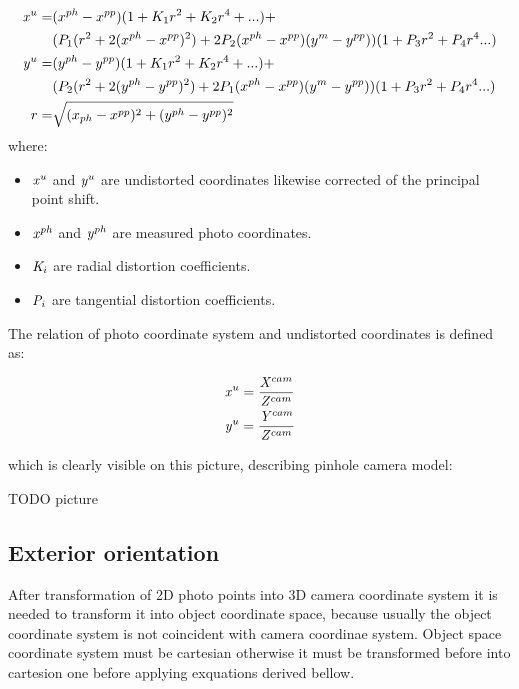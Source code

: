 \documentclass[a4paper,12pt]{report}
\newcommand{\escal}[1]{
{\it #1}
}
\begin{document}
\begin{equation}
\label{eq:undistort}
\begin{split}
\escal{x}^{u} =& (x^{ph} - x^{pp})(1 + K_{1}r^2 + K_2r^4 + ...) + \\
&(P_1(r^2 + 2(x^{ph} - x^{pp})^2) + 2P_2(x^{ph} - x^{pp})(y^{m} - y^{pp}))(1 + P_3r^2 + P_4r^4 ...) \\
\escal{y}^{u} =& (y^{ph} - y^{pp})(1 + K_1r^2 + K_2r^4 + ...) + \\
&(P_2(r^2 + 2(y^{ph} - y^{pp})^2) + 2P_1(x^{ph} - x^{pp})(y^{m} - y^{pp}))(1 + P_3r^2 + P_4r^4 ...) \\
r =& \sqrt{(x_{ph} - x^{pp})^2 + (y^{ph} - y^{pp})^2}
\end{split}
\end{equation}
where:
\begin{itemize}
  \item $\escal{x}^{u}$ and $\escal{y}^{u}$  are undistorted coordinates likewise corrected of the principal point shift.
  \item $\escal{x}^{ph}$ and $\escal{y}^{ph}$ are measured photo coordinates.
  \item $\escal{K}_{i}$ are radial distortion coefficients.
  \item $\escal{P}_{i}$ are tangential distortion coefficients.
\end{itemize}


The relation of photo coordinate system and undistorted coordinates is defined as:

\begin{equation}
\begin{split}
&\escal{x}^{u} = \frac{\escal{X}^{cam}}{\escal{Z}^{cam}} \\
&\escal{y}^{u} = \frac{\escal{Y}^{cam}}{\escal{Z}^{cam}}
\end{split}
\end{equation}

which is clearly visible on this picture, describing pinhole camera model:

TODO picture


\subsection{Exterior orientation}

After transformation of 2D photo points into 3D camera coordinate system it is needed to transform it into object coordinate space,
because usually the object coordinate system is not coincident with camera coordinae system. 
Object space coordinate system must be cartesian otherwise it must be transformed before into cartesion one before applying exquations 
derived bellow. 
\end{document}
